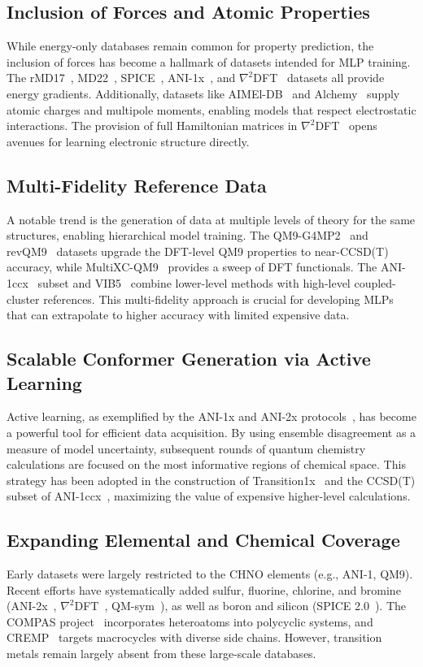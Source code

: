 \documentclass[12pt]{article}
\begin{document}
\subsection*{Inclusion of Forces and Atomic Properties}
While energy-only databases remain common for property prediction, the inclusion of forces has become a hallmark of datasets intended for MLP training. The rMD17~\cite{ds20-19}, MD22~\cite{ds22-21}, SPICE~\cite{ds12-43}, ANI-1x~\cite{ds26-3}, and $\nabla^2$DFT~\cite{ds31-23} datasets all provide energy gradients. Additionally, datasets like AIMEl-DB~\cite{ds5-5} and Alchemy~\cite{ds10-6} supply atomic charges and multipole moments, enabling models that respect electrostatic interactions. The provision of full Hamiltonian matrices in $\nabla^2$DFT~\cite{ds31-23} opens avenues for learning electronic structure directly.

\subsection*{Multi-Fidelity Reference Data}
A notable trend is the generation of data at multiple levels of theory for the same structures, enabling hierarchical model training. The QM9-G4MP2~\cite{ds2-36} and revQM9~\cite{ds4-42} datasets upgrade the DFT-level QM9 properties to near-CCSD(T) accuracy, while MultiXC-QM9~\cite{ds3-22} provides a sweep of DFT functionals. The ANI-1ccx~\cite{ds26-3} subset and VIB5~\cite{ds24-48} combine lower-level methods with high-level coupled-cluster references. This multi-fidelity approach is crucial for developing MLPs that can extrapolate to higher accuracy with limited expensive data.

\subsection*{Scalable Conformer Generation via Active Learning}
Active learning, as exemplified by the ANI-1x and ANI-2x protocols~\cite{ds26-3,ds27-8}, has become a powerful tool for efficient data acquisition. By using ensemble disagreement as a measure of model uncertainty, subsequent rounds of quantum chemistry calculations are focused on the most informative regions of chemical space. This strategy has been adopted in the construction of Transition1x~\cite{ds28-47} and the CCSD(T) subset of ANI-1ccx~\cite{ds26-3}, maximizing the value of expensive higher-level calculations.

\subsection*{Expanding Elemental and Chemical Coverage}
Early datasets were largely restricted to the CHNO elements (e.g., ANI-1, QM9). Recent efforts have systematically added sulfur, fluorine, chlorine, and bromine (ANI-2x~\cite{ds27-8}, $\nabla^2$DFT~\cite{ds31-23}, QM-sym~\cite{ds29-38}), as well as boron and silicon (SPICE 2.0~\cite{ds12-44}). The COMPAS project~\cite{ds32-13} incorporates heteroatoms into polycyclic systems, and CREMP~\cite{ds33-15} targets macrocycles with diverse side chains. However, transition metals remain largely absent from these large-scale databases.
\end{document}
